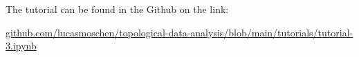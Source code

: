 The tutorial can be found in the Github on the link:

\noindent\url{github.com/lucasmoschen/topological-data-analysis/blob/main/tutorials/tutorial-3.ipynb}